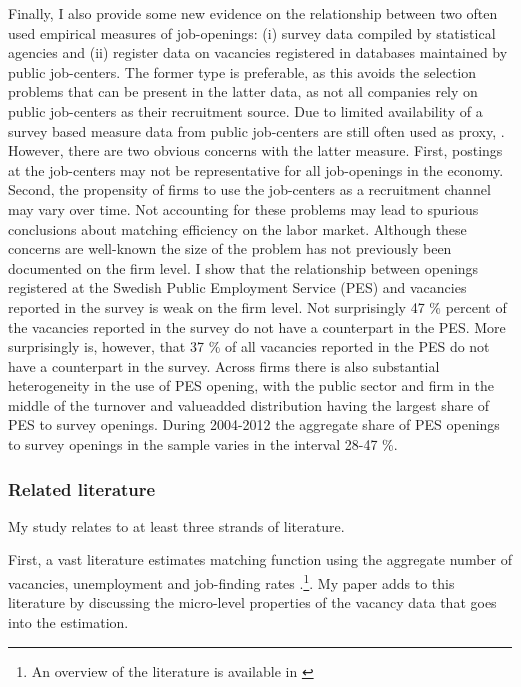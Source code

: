 Finally, I also provide some new evidence on the relationship between two often used empirical measures of job-openings: (i) survey data compiled by statistical agencies and (ii) register data on vacancies registered in databases maintained by public job-centers. The former type is preferable, as this avoids the selection problems that can be present in the latter data, as not all companies rely on public job-centers as their recruitment source. Due to limited availability of a survey based measure data from public job-centers are still often used as proxy, \citep{Berman1997, Carlsson2013, Hansen2004,  Wall2002, Yashiv2000}. However, there are two obvious concerns with the latter measure. First, postings at the job-centers may not be representative for all job-openings in the economy. Second, the propensity of firms to use the job-centers as a recruitment channel may vary over time.  Not accounting for these problems may lead to spurious conclusions about matching efficiency on the labor market. Although these concerns are well-known the size of the problem has not previously been documented on the firm level. I show that the relationship between openings registered at the Swedish Public Employment Service (PES) and vacancies reported in the survey is weak on the firm level. Not surprisingly 47 \% percent of the vacancies reported in the survey do not have a counterpart in the PES. More surprisingly is, however, that 37 \% of all vacancies reported in the PES do not have a counterpart in the survey. Across firms there is also substantial heterogeneity in the use of PES opening, with the public sector and firm in the middle of the turnover and valueadded distribution having the largest share of PES to survey openings. During 2004-2012 the aggregate share of PES openings to survey openings in the sample varies in the interval 28-47 \%.

\subsubsection{Related literature}

My study relates to at least three strands of literature. 

First, a vast literature estimates matching function using the aggregate number of vacancies, unemployment and job-finding rates \citep{Blanchard1990, Berman1997, Yashiv2000, Hansen2004, Sunde2007, Gross1997, Entorf1998, Feve1996}.\footnote{An overview of the literature is available in \cite{Pissarides2000}}. My paper adds to this literature by discussing the micro-level properties of the vacancy data that goes into the estimation. 


